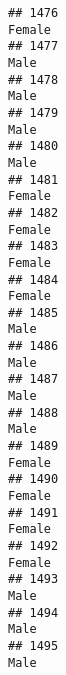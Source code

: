 \documentclass[]{article}
\begin{document}
\begin{verbatim}
## 1476                                                                                                                          Female
## 1477                                                                                                                            Male
## 1478                                                                                                                            Male
## 1479                                                                                                                            Male
## 1480                                                                                                                            Male
## 1481                                                                                                                          Female
## 1482                                                                                                                          Female
## 1483                                                                                                                          Female
## 1484                                                                                                                          Female
## 1485                                                                                                                            Male
## 1486                                                                                                                            Male
## 1487                                                                                                                            Male
## 1488                                                                                                                            Male
## 1489                                                                                                                          Female
## 1490                                                                                                                          Female
## 1491                                                                                                                          Female
## 1492                                                                                                                          Female
## 1493                                                                                                                            Male
## 1494                                                                                                                            Male
## 1495                                                                                                                            Male

\end{verbatim}
\end{document}
